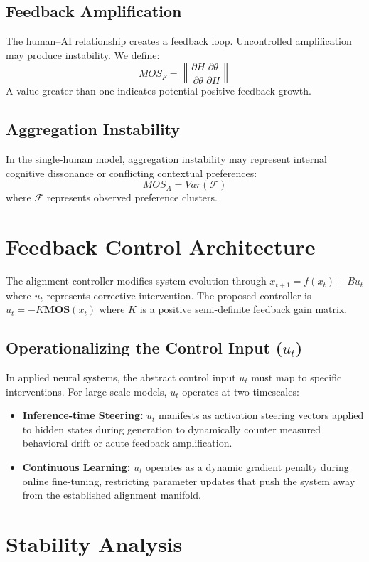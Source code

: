 \documentclass[11pt]{article}
\begin{document}
\subsection{Feedback Amplification}
The human--AI relationship creates a feedback loop. Uncontrolled amplification may produce instability. We define:
\[
MOS_F = \left\| \frac{\partial H}{\partial\theta} \frac{\partial\theta}{\partial H} \right\|
\]
A value greater than one indicates potential positive feedback growth.

\subsection{Aggregation Instability}
In the single-human model, aggregation instability may represent internal cognitive dissonance or conflicting contextual preferences:
\[
MOS_A = Var(\mathcal{F})
\]
where $\mathcal{F}$ represents observed preference clusters.

\section{Feedback Control Architecture}
The alignment controller modifies system evolution through $x_{t+1} = f(x_t)+Bu_t$ where $u_t$ represents corrective intervention. The proposed controller is $u_t = -K\mathbf{MOS}(x_t)$ where $K$ is a positive semi-definite feedback gain matrix. 

\subsection{Operationalizing the Control Input ($u_t$)}
In applied neural systems, the abstract control input $u_t$ must map to specific interventions. For large-scale models, $u_t$ operates at two timescales:
\begin{itemize}
\item \textbf{Inference-time Steering:} $u_t$ manifests as activation steering vectors applied to hidden states during generation to dynamically counter measured behavioral drift or acute feedback amplification.
\item \textbf{Continuous Learning:} $u_t$ operates as a dynamic gradient penalty during online fine-tuning, restricting parameter updates that push the system away from the established alignment manifold.
\end{itemize}

\section{Stability Analysis}
\end{document}
